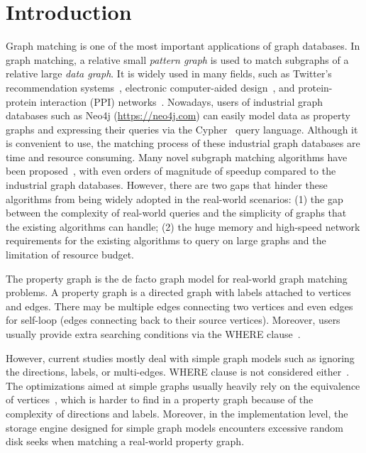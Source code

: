 \section{Introduction}
Graph matching
is one of the most important applications of graph databases. In graph matching, a relative small \emph{pattern graph} is used to match subgraphs of a relative large \emph{data graph}.
It is widely used in many fields,
such as Twitter's recommendation systems~\cite{DBLP:journals/pvldb/GuptaSGGZLL14,DBLP:journals/pvldb/SharmaJBLL16},
electronic computer-aided design~\cite{DBLP:conf/dac/OhlrichEGS93},
and protein-protein interaction (PPI) networks~\cite{milenkovic2008uncovering}.
Nowadays, users of industrial graph databases such as Neo4j (\url{https://neo4j.com})
can easily model data as property graphs and expressing their queries via the Cypher~\cite{DBLP:conf/sigmod/FrancisGGLLMPRS18,DBLP:journals/pvldb/SahuMSLO17} query language.
Although it is convenient to use, the matching process of these industrial graph databases are time and resource consuming.
Many novel subgraph matching algorithms have been proposed~\cite{DBLP:journals/pvldb/SunWWSL12,DBLP:conf/sigmod/HanLL13,DBLP:conf/sigmod/ShaoCCMYX14,DBLP:conf/cloud/SerafiniMS17,DBLP:journals/pvldb/QiaoZC17,DBLP:conf/sigmod/DiasTGM019}, with even orders of magnitude of speedup compared to the industrial graph databases.
However, there are two gaps that hinder these algorithms from being widely adopted in the real-world scenarios:
(1) the gap between the complexity of real-world queries and the simplicity of graphs that the existing algorithms can handle;
(2) the huge memory and high-speed network requirements for the existing algorithms to query on large graphs and the limitation of resource budget.

The property graph is the de facto graph model for real-world graph matching problems.
A property graph is a directed graph with labels attached to vertices and edges.
There may be multiple edges connecting two vertices and even edges for self-loop (edges connecting back to their source vertices).
Moreover, users usually provide extra searching conditions via the WHERE clause~\cite{DBLP:journals/csur/AnglesABHRV17}.

However,  current studies mostly deal with simple graph models such as ignoring the directions, labels, or multi-edges. WHERE clause is not considered either~\cite{DBLP:journals/pvldb/SunWWSL12,DBLP:conf/sigmod/HanLL13,DBLP:conf/sigmod/KimLBHLKJ16,DBLP:journals/pvldb/QiaoZC17,DBLP:journals/pvldb/MhedhbiS19}. The optimizations aimed at simple graphs usually heavily rely on the equivalence of vertices~\cite{DBLP:conf/sigmod/HanLL13,DBLP:journals/pvldb/QiaoZC17}, which is harder to find in a property graph because of the complexity of directions and labels. Moreover, in the implementation level, the storage engine designed for simple graph models encounters excessive random disk seeks when matching a real-world property graph.

